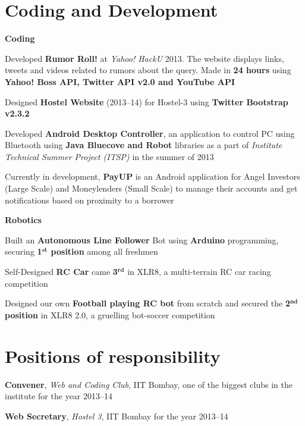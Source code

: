 \documentclass[margin,11pt]{resume}
\begin{document}
\begin{resume}
\section{\mysidestyle Coding and Development}
\textbf{Coding}
\begin{list2}
\item Developed \textbf{Rumor Roll!} at \textsl{Yahoo! HackU} 2013. The website displays links, tweets and videos related to rumors about the query. Made in \textbf{24 hours} using \textbf{Yahoo! Boss API, Twitter API v2.0 and YouTube API}
\item Designed \textbf{Hostel Website} (2013--14) for Hostel-3 using \textbf{Twitter Bootstrap v2.3.2}
\item Developed \textbf{Android Desktop Controller}, an application to control PC using Bluetooth using \textbf{Java Bluecove and Robot} libraries as a part of \textsl{Institute Technical Summer Project (ITSP)} in the summer of 2013
\item Currently in development, \textbf{PayUP} is an Android application for Angel Investors (Large Scale) and Moneylenders (Small Scale) to manage their accounts and get notifications based on proximity to a borrower
\end{list2}
\vspace{-3mm}
\textbf{Robotics}
\begin{list2}
\item Built an \textbf{Autonomous Line Follower} Bot using \textbf{Arduino} programming, securing \textbf{1$^{\textbf{st}}$ position} among all freshmen
\item Self-Designed \textbf{RC Car} came \textbf{3$^{\textbf{rd}}$} in XLR8, a multi-terrain RC car racing competition
\item Designed our own \textbf{Football playing RC bot} from scratch and secured the \textbf{2$^{\textbf{nd}}$ position} in XLR8 2.0, a gruelling bot-soccer competition
\end{list2}

\section{\mysidestyle Positions of responsibility}
\begin{list2}
\item \textbf{Convener}, \textsl{Web and Coding Club}, IIT Bombay, one of the biggest clubs in the institute for the year 2013--14
\item \textbf{Web Secretary}, \textsl{Hostel 3}, IIT Bombay for the year 2013--14
\end{list2}


\end{resume}
\end{document}
